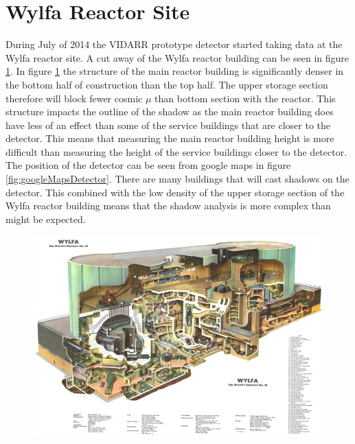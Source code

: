 \documentclass[12pt,a4paper]{article}
\begin{document}
\section{Wylfa Reactor Site} \label{sec:wylfaReactorSite}
During July of 2014 the VIDARR prototype detector started taking data at the Wylfa reactor site. A cut away of the Wylfa reactor building can be seen in figure \ref{fig:WylfaCutAway}. In figure \ref{fig:WylfaCutAway} the structure of the main reactor building is significantly denser in the bottom half of construction than the top half. The upper storage section therefore will block fewer cosmic $\mu$ than bottom section with the reactor. This structure impacts the outline of the shadow as the main reactor building does have less of an effect than some of the service buildings that are closer to the detector. This means that measuring the main reactor building height is more difficult than measuring the height of the service buildings closer to the detector. The position of the detector can be seen from google maps in figure \ref{fig:googleMapsDetector}. There are many buildings that will cast shadows on the detector. This combined with the low density of the upper storage section of the Wylfa reactor building means that the shadow analysis is more complex than might be expected. 

\begin{figure}[H]
 \centering
 \includegraphics[width=1.0\linewidth]{wylfaReactorBuildings/wylfaReactorRoughStructure.png}
 \label{fig:WylfaCutAway}
\end{figure}
\end{document}

